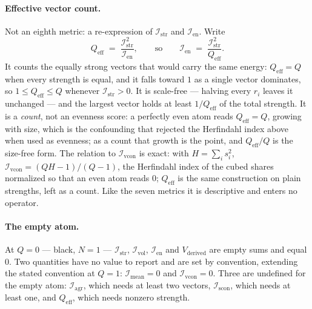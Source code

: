 \documentclass[12pt, a4paper]{article}
\begin{document}
\paragraph{Effective vector count.} Not an eighth metric: a
re-expression of $\mathcal{I}_{\mathrm{str}}$ and $\mathcal{I}_{\mathrm{en}}$.
Write
\[
    Q_{\mathrm{eff}} \;=\; \frac{\mathcal{I}_{\mathrm{str}}^{2}}{\mathcal{I}_{\mathrm{en}}},
    \qquad\text{so}\qquad
    \mathcal{I}_{\mathrm{en}} \;=\; \frac{\mathcal{I}_{\mathrm{str}}^{2}}{Q_{\mathrm{eff}}}.
\]
It counts the equally strong vectors that would carry the same
energy: $Q_{\mathrm{eff}}=Q$ when every strength is equal, and it falls
toward $1$ as a single vector dominates, so $1\le Q_{\mathrm{eff}}\le Q$ whenever $\mathcal{I}_{\mathrm{str}}>0$.
It is scale-free --- halving every $r_i$ leaves it unchanged --- and the
largest vector holds at least $1/Q_{\mathrm{eff}}$ of the total
strength. It is a \emph{count}, not an evenness score: a perfectly
even atom reads $Q_{\mathrm{eff}}=Q$, growing with size, which is the
confounding that rejected the Herfindahl index above when used as
evenness; as a count that growth is the point, and
$Q_{\mathrm{eff}}/Q$ is the size-free form. The relation to
$\mathcal{I}_{\mathrm{vcon}}$ is exact: with $H=\sum_i s_i^2$,
$\mathcal{I}_{\mathrm{vcon}}=(QH-1)/(Q-1)$, the Herfindahl index of the cubed
shares normalized so that an even atom reads $0$; $Q_{\mathrm{eff}}$ is
the same construction on plain strengths, left as a count. Like the
seven metrics it is descriptive and enters no operator.

\paragraph{The empty atom.} At $Q=0$ --- black, $N=1$ ---
$\mathcal{I}_{\mathrm{str}}$, $\mathcal{I}_{\mathrm{vol}}$, $\mathcal{I}_{\mathrm{en}}$
and $V_{\text{derived}}$ are empty sums and equal $0$. Two quantities
have no value to report and are set by convention, extending the stated
convention at $Q=1$: $\mathcal{I}_{\mathrm{mean}}=0$ and
$\mathcal{I}_{\mathrm{vcon}}=0$. Three are undefined for the empty atom:
$\mathcal{I}_{\mathrm{agr}}$, which needs at least two vectors,
$\mathcal{I}_{\mathrm{scon}}$, which needs at least one, and
$Q_{\mathrm{eff}}$, which needs nonzero strength.
\end{document}

